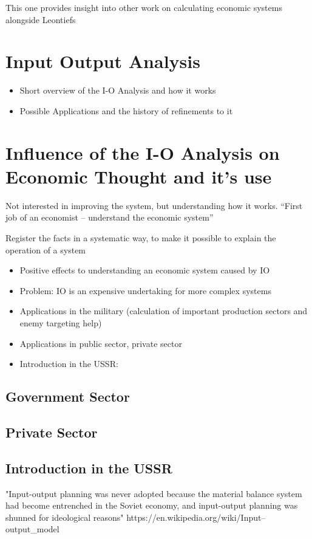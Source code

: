\documentclass[12pt,a4paper]{scrartcl}
\begin{document}
	This one provides insight into other work on calculating economic systems alongside Leontiefs \cite{Bjerkholt2006}
	
	\section{Input Output Analysis} \label{analysis}
	
	\begin{itemize}
		\item Short overview of the I-O Analysis and how it works
		\item Possible Applications and the history of refinements to it
	\end{itemize}
	
	\section{Influence of the I-O Analysis on Economic Thought and it's use}  \label{contribution}
	
	Not interested in improving the system, but understanding how it works. “First job of an economist – understand the economic system”
	
	Register the facts in a systematic way, to make it possible to explain the operation of a system
	
	\begin{itemize}
		\item Positive effects to understanding an economic system caused by IO
		\item Problem: IO is an expensive undertaking for more complex systems
		\item Applications in the military (calculation of important production sectors and enemy targeting help)
		\item Applications in public sector, private sector 
		\item Introduction in the USSR: \cite{leontief1960niedergang}
	\end{itemize}

	\subsection{Government Sector}
	
	\subsection{Private Sector}
	
	\subsection{Introduction in the USSR}
	"Input-output planning was never adopted because the material balance system had become entrenched in the Soviet economy, and input-output planning was shunned for ideological reasons" 
	 https://en.wikipedia.org/wiki/Input–output\_model
	
\end{document}
